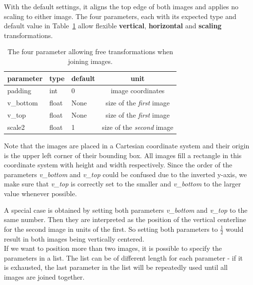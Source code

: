 \documentclass[a4paper, 12pt, bibliography=totoc]{scrartcl}
\begin{document}
With the default settings, it aligns the top edge of both images and applies no scaling to either image.
The four parameters, each with its expected type and default value in Table~\ref{tab:svgjoin} allow flexible \textbf{vertical}, \textbf{horizontal} and \textbf{scaling} transformations.
\begin{table}[h]
	\centering
	\begin{tabular}{|lllc|}
		
		\hline
	   parameter& type & default & unit\\
		\hline\hline
		 padding& int & 0&  image coordinates\\
		 
		  v\_bottom& float & None & size of the \textit{first} image\\
		  
		  v\_top& float & None & size of the \textit{first} image\\
		  
		 scale2& float & 1 & size of the \textit{second} image\\
		 
		 \hline\hline
	\end{tabular}
	\caption{The four parameter allowing free transformations when joining images.}\label{tab:svgjoin}
\end{table}

Note that the images are placed in a Cartesian coordinate system and their origin is the upper left corner of their bounding box. All images fill a rectangle in this coordinate system with height and width respectively.
Since the order of the parameters \textit{v\_bottom} and \textit{v\_top} could be confused due to the inverted y-axis, we make sure that \textit{v\_top} is correctly set to the smaller and \textit{v\_bottom} to the larger value whenever possible.

A special case is obtained by setting both parameters \textit{v\_bottom} and \textit{v\_top} to the same number. Then they are interpreted as the position of the vertical centerline for the second image in units of the first. So setting both parameters to $\frac{1}{2}$ would result in both images being vertically centered.\\

If we want to position more than two images, it is possible to specify the parameters in a list.
The list can be of different length for each parameter - if it is exhausted, the last parameter in the list will be repeatedly used until all images are joined together.
\end{document}
